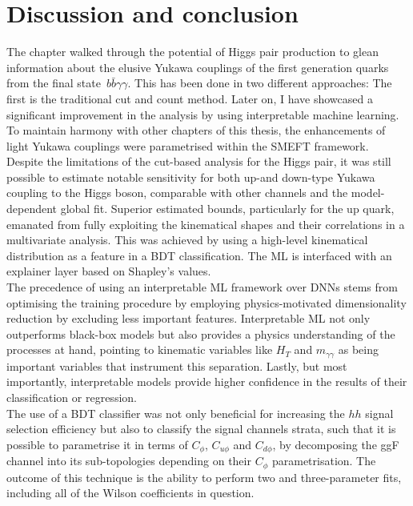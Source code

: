 \section{Discussion and conclusion \label{sec:concly}}
The chapter walked through the potential of Higgs pair production to glean information about the elusive Yukawa couplings of the first generation quarks from the final state~$b\bar{b}\gamma \gamma$. This has been done in two different approaches: The first is the traditional cut and count method. Later on, I have showcased a significant improvement in the analysis by using interpretable machine learning.   To maintain harmony with other chapters of this thesis, the enhancements of light Yukawa couplings were parametrised within the SMEFT framework. \\ 
Despite the limitations of the cut-based analysis for the Higgs pair, it was still possible to estimate notable sensitivity for both up-and down-type Yukawa coupling to the Higgs boson, comparable with other channels and the model-dependent global fit.  Superior estimated bounds, particularly for the up quark, emanated from fully exploiting the kinematical shapes and their correlations in a multivariate analysis. This was achieved by using a high-level kinematical distribution as a feature in a BDT classification. The ML is interfaced with an explainer layer based on Shapley's values. \\ The precedence of using an interpretable ML framework over DNNs stems from optimising the training procedure by employing physics-motivated dimensionality reduction by excluding less important features.  Interpretable ML not only outperforms black-box models but also provides a physics understanding of the processes at hand, pointing to kinematic variables like $H_T$ and $m_{\gamma\gamma}$ as being important variables that instrument this separation. Lastly, but most importantly,  interpretable models provide higher confidence in the results of their classification or regression.\\
The use of a BDT classifier was not only beneficial for increasing the $hh$ signal selection efficiency but also to classify the signal channels strata, such that it is possible to parametrise it in terms of $C_{\phi}$, $C_{u\phi}$ and $C_{d \phi}$, by decomposing the ggF channel into its sub-topologies depending on their $C_\phi$ parametrisation.   The outcome of this technique is the ability to perform two and three-parameter fits, including all of the Wilson coefficients in question. \\
